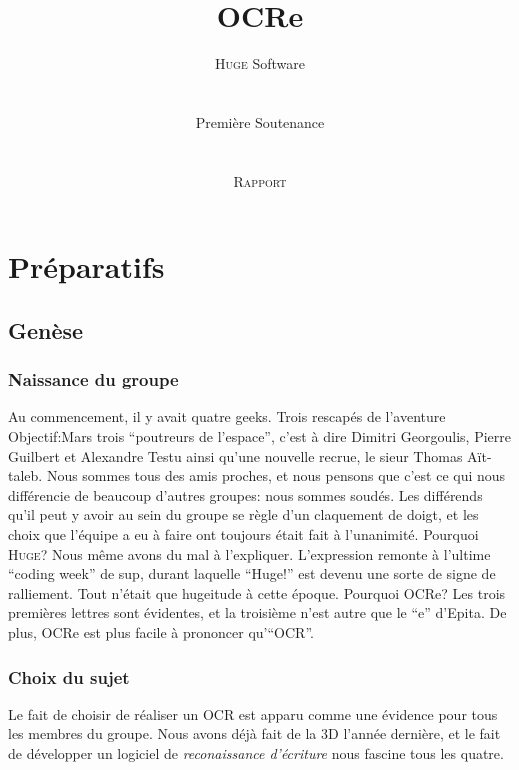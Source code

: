 \documentclass[]{report}
\title{OCRe}
\author{ \textsc{Huge} Software \\
\\
\\
Premi\`ere Soutenance \\
\\
\\
\textsc{Rapport}}
\date{}
\begin{document}
\ifpdf {} \else {} \fi

\maketitle

\pagebreak

\tableofcontents
\pagebreak

\part{Pr\'eparatifs}

\label{prt:preparatifs}

\chapter{Gen\`ese} %
\label{cha:genese}
	\section{Naissance du groupe} %
	\label{sec:naissance_du_groupe}
		Au commencement, il y avait quatre geeks. Trois rescap\'es de l'aventure Objectif:Mars trois ``poutreurs de l'espace'', c'est \`a dire Dimitri Georgoulis, Pierre Guilbert et Alexandre Testu ainsi qu'une nouvelle recrue, le sieur Thomas A\"it-taleb. Nous sommes tous des amis proches, et nous pensons que c'est ce qui nous diff\'erencie de beaucoup d'autres groupes: nous sommes soud\'es. Les diff\'erends qu'il peut y avoir au sein du groupe se r\`egle d'un claquement de doigt, et les choix que l'\'equipe a eu \`a faire ont toujours \'etait fait \`a l'unanimit\'e.
		\label{par:huge_ocre_}
			Pourquoi \textsc{Huge}? Nous m\^eme avons du mal \`a l'expliquer. L'expression remonte \`a l'ultime ``coding week'' de sup, durant laquelle ``Huge!'' est devenu une sorte de signe de ralliement. Tout n'\'etait que hugeitude \`a cette \'epoque.
			Pourquoi OCRe? Les trois premi\`eres lettres sont \'evidentes, et la troisi\`eme n'est autre que le ``e'' d'Epita. De plus, OCRe est plus facile \`a prononcer qu'``OCR''.

	\section{Choix du sujet} %
	\label{sec:choix_du_sujet}
		Le fait de choisir de r\'ealiser un OCR est apparu comme une \'evidence pour tous les membres du groupe. Nous avons d\'ej\`a fait de la 3D l'ann\'ee derni\`ere, et le fait de d\'evelopper un logiciel de \emph{reconaissance d'\'ecriture} nous fascine tous les quatre.
\end{document}
